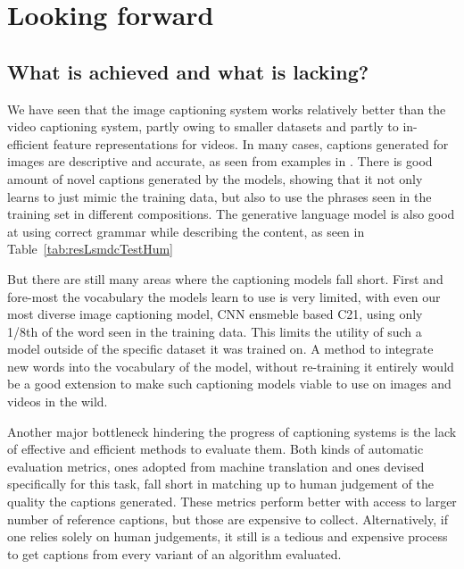 \chapter{Looking forward}
\label{chapter:discussion}
\section{What is achieved and what is lacking?}
We have seen that the image captioning system works relatively better than the
video captioning system, partly owing to smaller datasets and partly to
in-efficient feature representations for videos.
In many cases, captions generated for images are descriptive and accurate, as
seen from examples in .
There is good amount of novel captions generated by the models, showing that it
not only learns to just mimic the training data, but also to use the phrases
seen in the training set in different compositions.
The generative language model is also good at using correct grammar
while describing the content, as seen in Table~\ref{tab:resLsmdcTestHum}

But there are still many areas where the captioning models fall short.
First and fore-most the vocabulary the models learn to use is very limited, with
even our most diverse image captioning model, CNN ensmeble based C21, using only
1/8th of the word seen in the training data. 
This limits the utility of such a model outside of the specific dataset it was
trained on.
A method to integrate new words into the vocabulary of the model, without
re-training it entirely would be a good extension to make such captioning
models viable to use on images and videos in the wild.

Another major bottleneck hindering the progress of captioning systems is the
lack of effective and efficient methods to evaluate them.
Both kinds of automatic evaluation metrics, ones adopted from machine
translation and ones devised specifically for this task, fall short in matching
up to human judgement of the quality the captions generated.
These metrics perform better with access to larger number of reference captions,
but those are expensive to collect.
Alternatively, if one relies solely on human judgements, it still is a tedious
and expensive process to get captions from every variant of an algorithm
evaluated.

